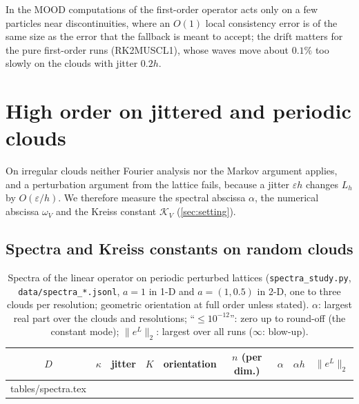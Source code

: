 \documentclass[11pt,a4paper]{article}
\makeatletter
\theoremstyle{plain}
\theoremstyle{definition}
\theoremstyle{remark}
\numberwithin{equation}{section}
\newcommand{\inputrows}[1]{\@@input #1 }%
\makeatother
\begin{document}
In the MOOD computations of \cite{JungMUSCL2026} the first-order operator acts only on a few particles near discontinuities, where an $O(1)$ local consistency error is of the same size as the error that the fallback is meant to accept; the drift matters for the pure first-order runs (RK2MUSCL1), whose waves move about $0.1\%$ too slowly on the clouds with jitter $0.2h$.

\section{High order on jittered and periodic clouds}\label{sec:numrandom}

On irregular clouds neither Fourier analysis nor the Markov argument applies, and a perturbation argument from the lattice fails, because a jitter $\varepsilon h$ changes $L_h$ by $O(\varepsilon/h)$. We therefore measure the spectral abscissa $\alpha$, the numerical abscissa $\omega_V$ and the Kreiss constant $\mathcal K_V$ (\cref{sec:setting}).

\subsection{Spectra and Kreiss constants on random clouds}

\begin{table}[p]
\centering
\caption{Spectra of the linear operator on periodic perturbed lattices (\texttt{spectra\_study.py}, \texttt{data/spectra\_*.jsonl}, $a=1$ in 1-D and $a=(1,0.5)$ in 2-D, one to three clouds per resolution; geometric orientation at full order unless stated). $\alpha$: largest real part over the clouds and resolutions; ``$\le10^{-12}$'': zero up to round-off (the constant mode); $\|e^{L}\|_2$: largest over all runs ($\infty$: blow-up).}\label{tab:spectra}
\footnotesize
\begin{tabular}{ccccccccc}
\toprule
$D$ & $\kappa$ & jitter & $K$ & orientation & $n$ (per dim.) & $\alpha$ & $\alpha h$ & $\|e^{L}\|_2$\\
\midrule
\inputrows{tables/spectra.tex}
\bottomrule
\end{tabular}
\end{table}
\end{document}
